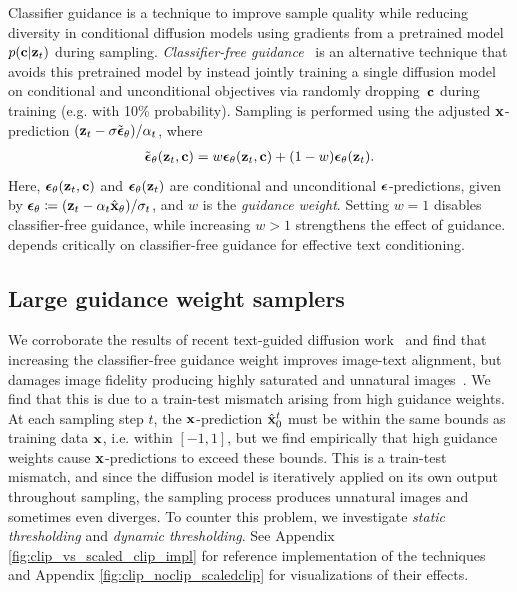 Classifier guidance \cite{dhariwal2021diffusion} is a technique to improve sample quality while reducing diversity in conditional diffusion models using gradients from a pretrained model $p(\mathbf{c}|\mathbf{z}_t)$ during sampling.
\emph{Classifier-free guidance}~\citep{ho2021classifierfree} is an alternative technique that avoids this pretrained model by instead jointly training a single diffusion model on conditional and unconditional objectives via randomly dropping~$\mathbf{c}$ during training (e.g. with 10\% probability). %
Sampling is performed using the adjusted $\mathbf{x}$-prediction $(\mathbf{z}_t - \sigma\tilde{{\boldsymbol{\epsilon}}}_\theta)/\alpha_t$, where
\begin{align}
    \tilde{{\boldsymbol{\epsilon}}}_\theta(\mathbf{z}_t, \mathbf{c}) = w{\boldsymbol{\epsilon}}_\theta(\mathbf{z}_t, \mathbf{c}) + (1-w){\boldsymbol{\epsilon}}_{\theta}(\mathbf{z}_t). \label{eq:classifier_free_score}
\end{align}
Here, ${\boldsymbol{\epsilon}}_\theta(\mathbf{z}_t, \mathbf{c})$ and ${\boldsymbol{\epsilon}}_{\theta}(\mathbf{z}_t)$ are conditional and unconditional ${\boldsymbol{\epsilon}}$-predictions, given by ${\boldsymbol{\epsilon}}_\theta \coloneqq (\mathbf{z}_t - \alpha_t\hat{\mathbf{x}}_\theta)/\sigma_t$, and $w$ is the \emph{guidance weight}. Setting $w = 1$ disables classifier-free guidance, while increasing $w > 1$ strengthens the effect of guidance. \name depends critically on classifier-free guidance for effective text conditioning.




\subsection{Large guidance weight samplers}
\vspace{-0.15cm}
We corroborate the results of recent text-guided diffusion work~\cite{dhariwal2021diffusion, nichol-glide, ramesh-dalle2} and find that increasing the classifier-free guidance weight improves image-text alignment, but damages image fidelity producing highly saturated and unnatural images~\citep{ho2021classifierfree}.
We find that this is due to a train-test mismatch arising from high guidance weights. At each sampling step $t$, the $\mathbf{x}$-prediction $\hat{\mathbf{x}}^t_0$ must be within the same bounds as training data $\mathbf{x}$, i.e. within $[-1, 1]$, but we find empirically that high guidance weights cause $\mathbf{x}$-predictions to exceed these bounds. This is a train-test mismatch, and since the diffusion model is iteratively applied on its own output throughout sampling, the sampling process produces unnatural images and sometimes even diverges. To counter this problem, we investigate \emph{static thresholding} and \emph{dynamic thresholding}. See Appendix  \cref{fig:clip_vs_scaled_clip_impl} for reference implementation of the techniques and Appendix \cref{fig:clip_noclip_scaledclip} for visualizations of their effects.



